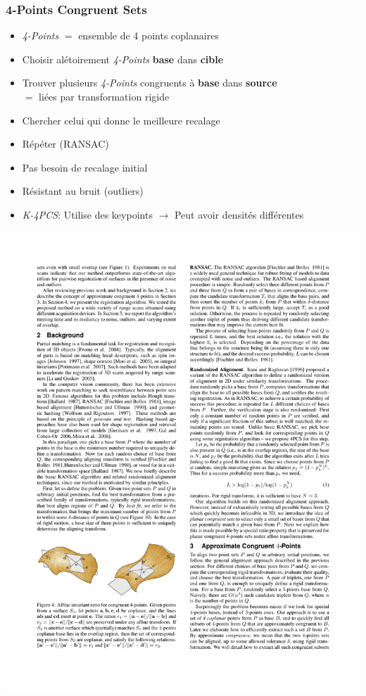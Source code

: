 \documentclass{beamer}
\begin{document}
\begin{frame}
\frametitle{4-Points Congruent Sets}
	\begin{itemize}
	\item \emph{4-Points} $=$ ensemble de 4 points coplanaires
	\item Choisir alétoirement \emph{4-Points} \textbf{base} dans \textbf{cible}
	\item Trouver plusieurs \emph{4-Points} congruents à \textbf{base} dans \textbf{source}
		\\ $=$ liées par transformation rigide
	\item Chercher celui qui donne le meilleure recalage
	\item Répéter (RANSAC)
	\item Pas besoin de recalage initial
	\item Résistant au bruit (outliers)
	\item \emph{K-4PCS}: Utilise des keypoints $\rightarrow$ Peut avoir densités différentes
	\end{itemize}
	\center \includegraphics[width=.7\textwidth]{4pcs.pdf} {\footnotesize \cite{Aige2008}}
\end{frame}


\footnotesize 
\end{document}
